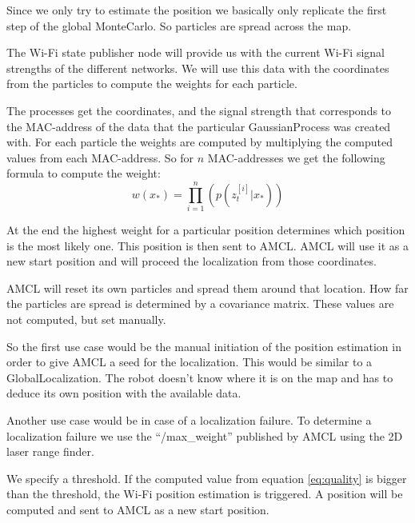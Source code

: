 Since we only try to estimate the position we basically only replicate the first step of the global \Gls{MonteCarlo}. So particles are spread across the map. 

The Wi-Fi state publisher node will provide us with the current Wi-Fi signal strengths of the different networks. We will use this data with the coordinates from the particles to compute the weights for each particle. 

The processes get the coordinates, and the signal strength that corresponds to the \Gls{MAC-address} of the data that the particular \Gls{GaussianProcess} was created with. For each particle the weights are computed by multiplying the computed values from each \Gls{MAC-address}. So for $n$ \Gls{MAC-address}es we get the following formula to compute the weight:
\begin{equation}
w(x_*) = \prod_{i=1}^n(p(z_{t}^{[i]}|x_*))
\end{equation} 

At the end the highest weight for a particular position determines which position is the most likely one. This position is then sent to AMCL. AMCL will use it as a new start position and will proceed the localization from those coordinates. 

AMCL will reset its own particles and spread them around that location. How far the particles are spread is determined by a covariance matrix. These values are not computed, but set manually.

So the first use case would be the manual initiation of the position estimation in order to give AMCL a seed for the localization. This would be similar to a \gls{GlobalLocalization}. The robot doesn't know where it is on the map and has to deduce its own position with the available data. 

Another use case would be in case of a localization failure. To determine a localization failure we use the ``/max\_weight'' published by AMCL using the 2D laser range finder.

We specify a threshold. If the computed value from equation \ref{eq:quality} is bigger than the threshold, the Wi-Fi position estimation is triggered. A position will be computed and sent to AMCL as a new start position. 

